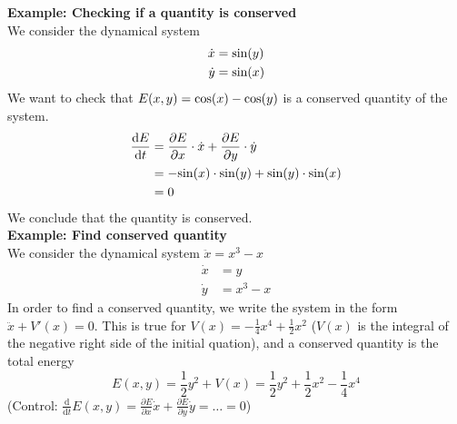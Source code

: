 \textbf{Example: Checking if a quantity is conserved}\\
We consider the dynamical system
\begin{equation}
  \begin{split}
    \dot{x} &= \textup{sin}(y)\\
    \dot{y} &= \textup{sin}(x)
  \end{split}
\end{equation}
We want to check that $E(x, y) = \textup{cos}(x) - \textup{cos}(y)$ is a conserved quantity of the system.
\begin{equation}
  \begin{split}
    \frac{\mathrm{d} E}{\mathrm{d} t} &= \frac{\partial E}{\partial x} \cdot \dot{x} + \frac{\partial E}{\partial y} \cdot \dot{y}\\
    &= -\textup{sin}(x) \cdot \textup{sin}(y) + \textup{sin}(y) \cdot \textup{sin}(x)\\
    &= 0
  \end{split}
\end{equation}
We conclude that the quantity is conserved.\\

\textbf{Example: Find conserved quantity}\\
We consider the dynamical system $\ddot{x} = x^3 - x$
\begin{equation}
  \begin{split}
    \dot{x} &= y\\
    \dot{y} &= x^3 - x
  \end{split}
\end{equation}
In order to find a conserved quantity, we write the system in the form $\ddot{x} + V'(x) = 0$.
This is true for $V(x) = -\frac{1}{4}x^4 + \frac{1}{2}x^2$ ($V(x)$ is the integral of the negative right side of the initial quation), and a conserved quantity is the total energy
\begin{equation}
  E(x, y) = \frac{1}{2}y^2 + V(x) = \frac{1}{2}y^2 + \frac{1}{2}x^2 - \frac{1}{4}x^4
\end{equation}
(Control: $\frac{\mathrm{d}}{\mathrm{d} t}E(x, y) = \frac{\partial E}{\partial x} \dot{x} + \frac{\partial E}{\partial y} \dot{y} = \dots = 0$)

